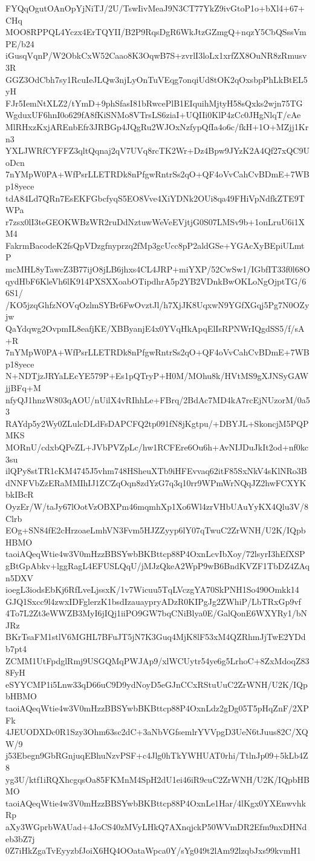 FYQqOgutOAnOpYjNiTJ/2U/TswIivMeaJ9N3CT77YkZ9ivGtoP1o+bXl4+67+CHq
MOO8RPPQL4Yczx4ErTQYII/B2P9RqsDgR6WkJtzGZmgQ+nqzY5CbQSssVmPE/b24
iGusqVqnP/W2ObkCxW52Caao8K3OqwB7S+zvrlI3loLx1xrfZX8OuNR8zRmusv3R
GGZ3OdCbh7sy1RcuIeJLQw3njLyOnTuVEqg7onqiUd8tOK2qOxsbpPhLkBtEL5yH
FJr5IemNtXLZ2/tYmD+9phSfasI81bRwcePlB1EIquihMjtyH58sQxks2wjn75TG
WgduxUF6hnI0o629fA8fKiSNMo8VTrsLS6ziaI+UQIIi0KlP4zCc0JHgNlqT/cAe
MlRHxzKxjAREnbEfr3JRBGp4JQgRu2WJOxNzfypQfIa4o6c/fkH+1O+MZjj1Krn3
YXLJWRfCYFFZ3qltQqnaj2qV7UVq8rcTK2Wr+Dz4Bpw9JYzK2A4Qf27xQC9UoDcn
7nYMpW0PA+WfPsrLLETRDk8nPfgwRntrSs2qO+QF4oVvCahCvBDmE+7WBp18yece
tdA84Ld7QRn7EsEKFGbcfyqS5EO8Vve4XiYDNk2OUi8qa49FHiVpNdfkZTE9TWPa
r7zsx0lI3teGEOKWBzWR2ruDdNztuwWeVeEVjtjG0S07LMSv9b+1onLruU6i1XM4
FakrmBacodeK2fsQpVDzgfnyprzq2fMp3gcUcc8pP2aldGSe+YGAcXyBEpiULmtP
mcMHL8yTawcZ3B77ijO8jLB6jhxs4CL4JRP+miYXP/52CwSw1/IGbfIT33f0l68O
qydHbF6KleVh6lK914PXSXXoabOTipdhrA5p2YB2VDnkBwOKLoNgOjptTG/66S1/
/KO5jzqGhfzNOVqOzlmSYBr6FwOvztJl/h7XjJK8UqxwN9YGfXGqj5Pg7N0OZyjw
QaYdqwg2OvpmIL8eafjKE/XBByanjE4x0YVqHkApqElIsRPNWrIQgdSS5/f/sA+R
7nYMpW0PA+WfPsrLLETRDk8nPfgwRntrSs2qO+QF4oVvCahCvBDmE+7WBp18yece
N+NDTjzJRYaLEcYE579P+Es1pQTryP+H0M/MOhu8k/HVtMS9gXJNSyGAWjjBFq+M
nfyQJ1hnzW803qAOU/nUilX4vRIhhLe+FBrq/2BdAc7MD4kA7rcEjNUzorM/0a53
RAYdp5y2Wy0ZLulcDLdFsDAPCFQ2tp091fN8jKgtpu/+DBYJL+SkoncjM5PQPMKS
MORnU/cdxbQPeZL+JVbPVZpLc/hw1RCFEre6Ou6h+AvNIJDuJkIt2od+nf0kc3su
ilQPy8stTR1cKM4745J5vhm748HSheuXTb9iHFEvvaq62itF85SxNkV4sKlNRo3B
dNNFVbZzERaMMIhIJ1ZCZqOqn8zdYzG7q3q10rr9WPmWrNQqJZ2hwFCXYKbkIBcR
OyzEr/W/taJy67lOotVzOBXPm46mqmhXp1Xo6Wl4zrVHbUAuYyKX4Qlu3V/8Clrb
EOg+SN84fE2cHrzoaeLmhVN3Fvm5HJZZyyp6lY07qTwuC2ZrWNH/U2K/IQpbHBMO
taoiAQeqWtie4w3V0mHzzBBSYwbBKBttcp88P4OxnLcvIbXoy/72lsyrI3hEfXSP
gBtGpAbkv+lggRagL4EFUSLQqU/jMJzQkeA2WpP9wB6BndKVZF1TbDZ4ZAqn5DXV
ioegL3iodsEbKj6RfLveLjssxK/1v7Wicuu5TqLVczgYA70SkPNH1So490Omkk14
GJQ1Sxcc9l4zwxIDFglerzK1bsdIzauaypryADzR0KIPgJg2ZWhiP/LbTRxGp9vf
4To7L2Zt3eWWZB3MyI6jIQj1iiPO9GW7bqCNiBlya0E/GalQonE6WXYRy1/bNJRz
BKrTsaFM1stlV6MGHL7BFuJT5jN7K3Guq4MjK8lF53xM4QZRhmJjTwE2YDdb7pt4
ZCMM1UtFpdglRmj9USGQMqPWJAp9/xlWCUytr54ye6g5LrhoC+8ZxMdoqZ838FyH
eSYYCMP1i5Lnw33qD66uC9D9ydNoyD5eGJnCCxRStuUuC2ZrWNH/U2K/IQpbHBMO
taoiAQeqWtie4w3V0mHzzBBSYwbBKBttcp88P4OxnLdz2gDg05T5pHqZnF/2XPFk
4JEUODXDc0R1Szy3Ohm63sc2dC+3aNbVGfsemlrYVVpgD3UeN6tJuus82C/XQW/9
j53Ebegn9GbRGnjuqEBhuNzvPSF+c4Jlg0hTkYWHUAT0rhi/TtlnJp09+5kLb4Z8
yg3U/ktf1iRQXhcgqsOa85FKMnM4SpH2dU1ei46iR9cuC2ZrWNH/U2K/IQpbHBMO
taoiAQeqWtie4w3V0mHzzBBSYwbBKBttcp88P4OxnLe1Har/4lKgx0YXEnwvhkRp
aXy3WGprbWAUad+4JoCS40zMVyLHkQ7AXnqjckP50WVmDR2Efm9nxDHNdeb3bZ7j
0Z7iHkZgaTvEyyzbfJoiX6HQ4OOataWpca0Y/sYg049t2lAm92lzqbJxs99kvmH1
